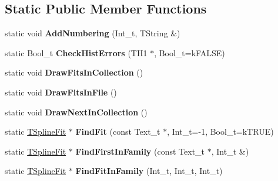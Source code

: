 \subsection*{Static Public Member Functions}
\begin{DoxyCompactItemize}
\item 
\hypertarget{classTSplineFit_a76ffe87f58f9e35803112f2d3322ea05}{
static void {\bfseries AddNumbering} (Int\_\-t, TString \&)}
\label{classTSplineFit_a76ffe87f58f9e35803112f2d3322ea05}

\item 
\hypertarget{classTSplineFit_aebe443c5437e188d01bed7159595ac9d}{
static Bool\_\-t {\bfseries CheckHistErrors} (TH1 $\ast$, Bool\_\-t=kFALSE)}
\label{classTSplineFit_aebe443c5437e188d01bed7159595ac9d}

\item 
\hypertarget{classTSplineFit_a052354cb5dac6b4ecb11bb25751d9abb}{
static void {\bfseries DrawFitsInCollection} ()}
\label{classTSplineFit_a052354cb5dac6b4ecb11bb25751d9abb}

\item 
\hypertarget{classTSplineFit_ad3afecb9461482859141b3cacb718a7c}{
static void {\bfseries DrawFitsInFile} ()}
\label{classTSplineFit_ad3afecb9461482859141b3cacb718a7c}

\item 
\hypertarget{classTSplineFit_ab672c4e604f7d46d211db3be3559cfb3}{
static void {\bfseries DrawNextInCollection} ()}
\label{classTSplineFit_ab672c4e604f7d46d211db3be3559cfb3}

\item 
\hypertarget{classTSplineFit_ab1c4b5f9a9870ec7c2b2d5ea52407696}{
static \hyperlink{classTSplineFit}{TSplineFit} $\ast$ {\bfseries FindFit} (const Text\_\-t $\ast$, Int\_\-t=-\/1, Bool\_\-t=kTRUE)}
\label{classTSplineFit_ab1c4b5f9a9870ec7c2b2d5ea52407696}

\item 
\hypertarget{classTSplineFit_a6cbae59f46987ad2186f44f60276685e}{
static \hyperlink{classTSplineFit}{TSplineFit} $\ast$ {\bfseries FindFirstInFamily} (const Text\_\-t $\ast$, Int\_\-t \&)}
\label{classTSplineFit_a6cbae59f46987ad2186f44f60276685e}

\item 
\hypertarget{classTSplineFit_a975d6a369c95c6efcc5a21835fa0e43e}{
static \hyperlink{classTSplineFit}{TSplineFit} $\ast$ {\bfseries FindFitInFamily} (Int\_\-t, Int\_\-t, Int\_\-t)}
\label{classTSplineFit_a975d6a369c95c6efcc5a21835fa0e43e}


\end{DoxyCompactItemize}

